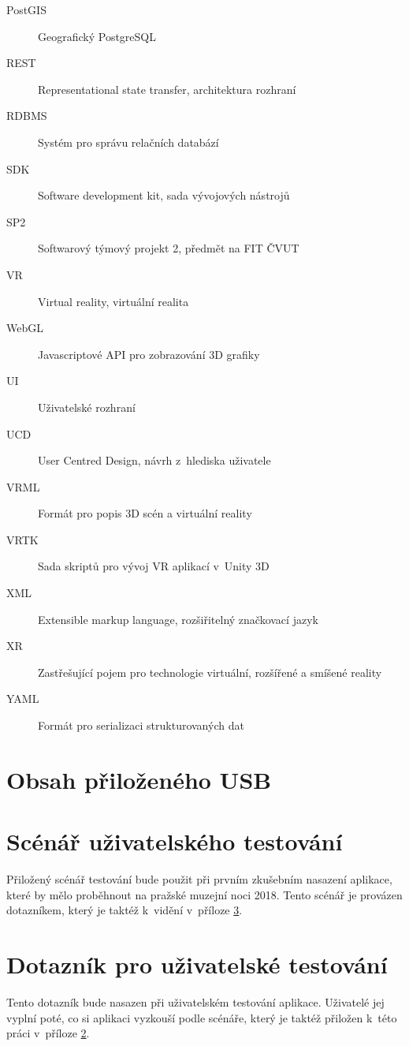 \documentclass[thesis=B,czech]{FITthesis}[2012/06/26]
\begin{document}
\begin{description}
    \item[PostGIS] Geografický PostgreSQL
	\item[REST] Representational state transfer, architektura rozhraní
	\item[RDBMS] Systém pro správu relačních databází
	\item[SDK] Software development kit, sada vývojových nástrojů 
	\item[SP2] Softwarový týmový projekt 2, předmět na FIT ČVUT
	\item[VR] Virtual reality, virtuální realita
    \item[WebGL] Javascriptové API pro zobrazování 3D grafiky
    \item[UI] Uživatelské rozhraní
    \item[UCD] User Centred Design, návrh z~hlediska uživatele
    \item[VRML] Formát pro popis 3D scén a virtuální reality
    \item[VRTK] Sada skriptů pro vývoj VR aplikací v~Unity 3D
	\item[XML] Extensible markup language, rozšiřitelný značkovací jazyk
	\item[XR] Zastřešující pojem pro technologie virtuální, rozšířené a smíšené reality
	\item[YAML] Formát pro serializaci strukturovaných dat
\end{description}


\chapter{Obsah přiloženého USB}


\begin{figure}
\end{figure}

\chapter{Scénář uživatelského testování} \label{sec:scenar}
Přiložený scénář testování bude použit při prvním zkušebním nasazení aplikace, které by mělo proběhnout na pražské muzejní noci 2018. Tento scénář je provázen dotazníkem, který je taktéž k~vidění v~příloze \ref{sec:dotaznik}.

\chapter{Dotazník pro uživatelské testování} \label{sec:dotaznik}
Tento dotazník bude nasazen při uživatelském testování aplikace. Uživatelé jej vyplní poté, co si aplikaci vyzkouší podle scénáře, který je taktéž přiložen k~této práci v~příloze \ref{sec:scenar}.


  
\end{document}
